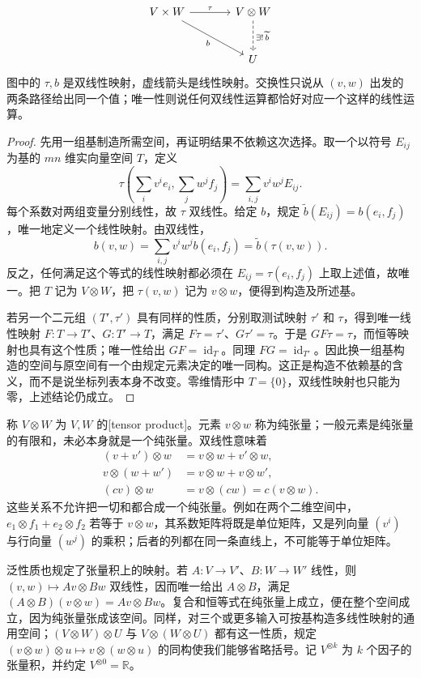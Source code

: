 \[
	\begin{tikzcd}[column sep=large,row sep=large]
		V\times W \arrow[r,"\tau"] \arrow[dr,"b"'] & V\otimes W \arrow[d,dashed,"\exists!\,\widetilde b"] \\
		& U
	\end{tikzcd}
\]
图中的 \(\tau,b\) 是双线性映射，虚线箭头是线性映射。交换性只说从 \((v,w)\) 出发的两条路径给出同一个值；唯一性则说任何双线性运算都恰好对应一个这样的线性运算。

\begin{proof}
	先用一组基制造所需空间，再证明结果不依赖这次选择。取一个以符号 \(E_{ij}\) 为基的 \(mn\) 维实向量空间 \(T\)，定义
	\[
		\tau\left(\sum_i v^ie_i,\sum_j w^jf_j\right)=\sum_{i,j}v^iw^jE_{ij}.
	\]
	每个系数对两组变量分别线性，故 \(\tau\) 双线性。给定 \(b\)，规定 \(\widetilde b(E_{ij})=b(e_i,f_j)\)，唯一地定义一个线性映射。由双线性，
	\[
		b(v,w)=\sum_{i,j}v^iw^j b(e_i,f_j)=\widetilde b(\tau(v,w)).
	\]
	反之，任何满足这个等式的线性映射都必须在 \(E_{ij}=\tau(e_i,f_j)\) 上取上述值，故唯一。把 \(T\) 记为 \(V\otimes W\)，把 \(\tau(v,w)\) 记为 \(v\otimes w\)，便得到构造及所述基。

	若另一个二元组 \((T',\tau')\) 具有同样的性质，分别取测试映射 \(\tau'\) 和 \(\tau\)，得到唯一线性映射 \(F:T\to T'\)、\(G:T'\to T\)，满足 \(F\tau=\tau'\)、\(G\tau'=\tau\)。于是 \(GF\tau=\tau\)，而恒等映射也具有这个性质；唯一性给出 \(GF=\operatorname{id}_T\)。同理 \(FG=\operatorname{id}_{T'}\)。因此换一组基构造的空间与原空间有一个由规定元素决定的唯一同构。这正是构造不依赖基的含义，而不是说坐标列表本身不改变。零维情形中 \(T=\{0\}\)，双线性映射也只能为零，上述结论仍成立。
\end{proof}

称 \(V\otimes W\) 为 \(V,W\) 的[tensor product]。元素 \(v\otimes w\) 称为纯张量；一般元素是纯张量的有限和，未必本身就是一个纯张量。双线性意味着
\[
	\begin{aligned}
		(v+v')\otimes w&=v\otimes w+v'\otimes w,\\
		v\otimes(w+w')&=v\otimes w+v\otimes w',\\
		(cv)\otimes w&=v\otimes(cw)=c(v\otimes w).
	\end{aligned}
\]
这些关系不允许把一切和都合成一个纯张量。例如在两个二维空间中，\(e_1\otimes f_1+e_2\otimes f_2\) 若等于 \(v\otimes w\)，其系数矩阵将既是单位矩阵，又是列向量 \((v^i)\) 与行向量 \((w^j)\) 的乘积；后者的列都在同一条直线上，不可能等于单位矩阵。

\ProseParagraphBreak

泛性质也规定了张量积上的映射。若 \(A:V\to V'\)、\(B:W\to W'\) 线性，则 \((v,w)\mapsto Av\otimes Bw\) 双线性，因而唯一给出 \(A\otimes B\)，满足 \((A\otimes B)(v\otimes w)=Av\otimes Bw\)。复合和恒等式在纯张量上成立，便在整个空间成立，因为纯张量张成该空间。同样，对三个或更多输入可按基构造多线性映射的通用空间；\((V\otimes W)\otimes U\) 与 \(V\otimes(W\otimes U)\) 都有这一性质，规定 \((v\otimes w)\otimes u\mapsto v\otimes(w\otimes u)\) 的同构使我们能够省略括号。记 \(V^{\otimes k}\) 为 \(k\) 个因子的张量积，并约定 \(V^{\otimes0}=\mathbb R\)。

